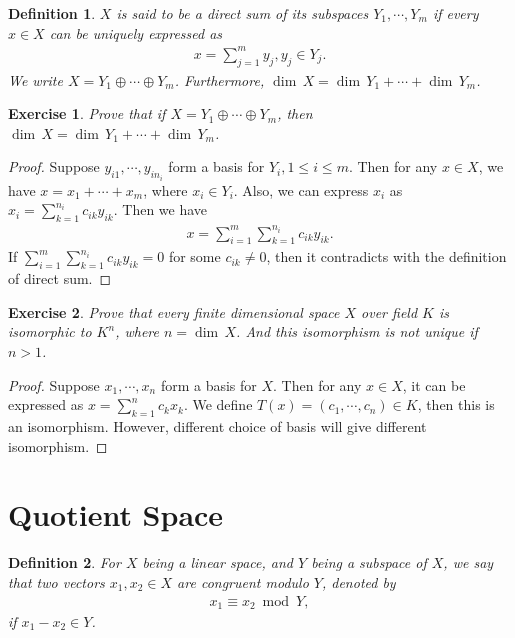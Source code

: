 \documentclass[11pt]{book}
\newtheorem{definition}{Definition}[chapter]
\newtheorem{exercise}{Exercise}[section]
\theoremstyle{definition}
\numberwithin{equation}{chapter}
\begin{document}
\medskip

\begin{definition}
$X$ is said to be a direct sum of its subspaces $Y_1, \cdots, Y_m$ if every $x\in X$ can be uniquely expressed as
\begin{align*}
    x = \sum^m_{j=1}y_j, y_j\in Y_j.
\end{align*}
We write $X = Y_1 \oplus \cdots \oplus Y_m$. Furthermore, $ \dim \,X =  \dim \,Y_1 +\cdots +  \dim \,Y_m$.
\end{definition}

\medskip

\begin{exercise}
Prove that if $X = Y_1 \oplus \cdots \oplus Y_m$, then $ \dim \,X =  \dim \,Y_1 +\cdots +  \dim \,Y_m$.
\end{exercise}
\begin{proof}
Suppose $y_{i1}, \cdots, y_{in_i}$ form a basis for $Y_i, 1\leq i\leq m$. Then for any $x\in X$, we have $x = x_1 +\cdots +x_m$, where $x_i\in Y_i$. Also, we can express $x_i$ as $x_i = \sum^{n_i}_{k=1}c_{i k} y_{i k}$. Then we have 
\begin{align*}
    x = \sum^m_{i=1}\sum^{n_i}_{k=1}c_{i k} y_{i k}.
\end{align*}
If $\sum^m_{i=1}\sum^{n_i}_{k=1}c_{i k} y_{i k} = 0$ for some $c_{ik}\neq 0$, then it contradicts with the definition of direct sum.
\end{proof}

\medskip

\begin{exercise}
Prove that every finite dimensional space $X$ over field $K$ is isomorphic to $K^n$, where $n =  \dim \,X$. And this isomorphism is not unique if $n > 1$.
\end{exercise}
\begin{proof}
Suppose $x_1,\cdots, x_n$ form a basis for $X$. Then for any $x\in X$, it can be expressed as $x = \sum^n_{k=1}c_k x_k$. We define $T(x) = (c_1, \cdots, c_n)\in K$, then this is an isomorphism. However, different choice of basis will give different isomorphism.
\end{proof}

\medskip

\section{Quotient Space}
\begin{definition}
For $X$ being a linear space, and $Y$ being a subspace of $X$, we say that two vectors $x_1, x_2\in X$ are congruent modulo $Y$, denoted by
\begin{align*}
    x_1 \equiv x_2 \bmod Y,
\end{align*}
if $x_1-x_2\in Y$.
\end{definition}
\end{document}
